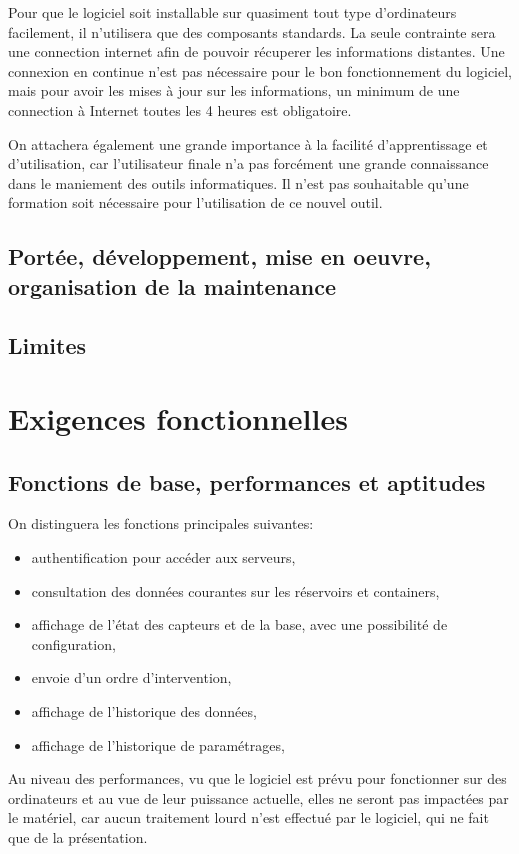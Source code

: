 Pour que le logiciel soit installable sur quasiment tout type d'ordinateurs facilement, il n'utilisera que des composants standards. La seule contrainte sera une connection internet afin de pouvoir récuperer les informations distantes. Une connexion en continue n'est pas nécessaire pour le bon fonctionnement du logiciel, mais pour avoir les mises à jour sur les informations, un minimum de une connection à Internet toutes les 4 heures est obligatoire.

On attachera également une grande importance à la facilité d'apprentissage et d'utilisation, car l'utilisateur finale n'a pas forcément une grande connaissance dans le maniement des outils informatiques. Il n'est pas souhaitable qu'une formation soit nécessaire pour l'utilisation de ce nouvel outil.

\subsection{Portée, développement, mise en oeuvre, organisation de la maintenance}
\subsection{Limites}

\section{Exigences fonctionnelles}
\subsection{Fonctions de base, performances et aptitudes}
On distinguera les fonctions principales suivantes:
\begin{itemize}
	\item authentification pour accéder aux serveurs,
	\item consultation des données courantes sur les réservoirs et containers,
	\item affichage de l'état des capteurs et de la base, avec une possibilité de configuration,
	\item envoie d'un ordre d'intervention,
	\item affichage de l'historique des données,
	\item affichage de l'historique de paramétrages,
\end{itemize}

Au niveau des performances, vu que le logiciel est prévu pour fonctionner sur des ordinateurs et au vue de leur puissance actuelle, elles ne seront pas impactées par le matériel, car aucun traitement lourd n'est effectué par le logiciel, qui ne fait que de la présentation.

